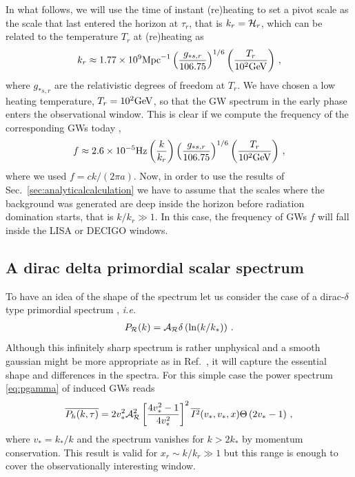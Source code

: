 \documentclass[aps,10pt,prd,groupedaddress,nofootinbib,notitlepage,eqsecnum,preprintnumbers]{revtex4-1}
\begin{document}
In what follows, we will use the time of instant (re)heating to set a pivot scale as the scale that last entered the horizon at $\tau_r$, that is $k_r={\cal H}_r$, which can be related to the temperature $T_r$ at (re)heating as \cite{Alabidi:2013wtp}
\begin{align}
k_r\approx 1.77\times 10^{9}{\rm Mpc}^{-1}\left(\frac{g_{*s,r}}{106.75}\right)^{1/6}\left(\frac{T_r}{10^2{\rm GeV}}\right)\,,
\end{align}
where $g_{*s,r}$ are the relativistic degrees of freedom at $T_r$. We have chosen a low heating temperature, $T_r=10^2{\rm GeV}$, so that the GW spectrum in the early phase enters the observational window. This is clear if we compute the frequency of the corresponding GWs today \cite{Alabidi:2013wtp},
\begin{align}
f\approx 2.6\times 10^{-5}{\rm Hz}\left(\frac{k}{k_r}\right)\left(\frac{g_{*s,r}}{106.75}\right)^{1/6}\left(\frac{T_r}{10^2{\rm GeV}}\right)\,,
\end{align}
where we used $f={ck}/({2\pi a})$. Now, in order to use the results of Sec.~\ref{sec:analyticalcalculation} we have to assume that the scales where the background was generated are deep inside the horizon before radiation domination starts, that is $k/k_r\gg1$. In this case, the frequency of GWs $f$ will fall inside the LISA or DECIGO windows.

\subsection{A dirac delta primordial scalar spectrum}

To have an idea of the shape of the spectrum let us consider the case of a dirac-$\delta$ type primordial spectrum \cite{Kohri:2018awv}, \textit{i.e.}
\begin{align}\label{eq:delta}
P_{\cal R}(k)={\cal A}_{\cal R}\delta\left(\ln(k/k_*)\right)\,.
\end{align}
Although this infinitely sharp spectrum is rather unphysical and a smooth gaussian might be more appropriate as in Ref.~\cite{Cai:2018dig}, it will capture the essential shape and differences in the spectra. For this simple case the power spectrum \eqref{eq:pgamma} of induced GWs reads
\begin{align}
\overline{P_h(k,\tau)}=2v_*^2{\cal A}^2_{\cal R}\left[\frac{4v_*^2-1}{4v_*^2}\right]^2 \overline{I^2}(v_*,v_*,x)\Theta\left(2v_*-1\right)\,,
\end{align}
where $v_*=k_*/k$ and the spectrum vanishes for $k>2k_*$ by momentum conservation. This result is valid for $x_r\sim k/k_r\gg1$ but this range is enough to cover the observationally interesting window.
\end{document}
